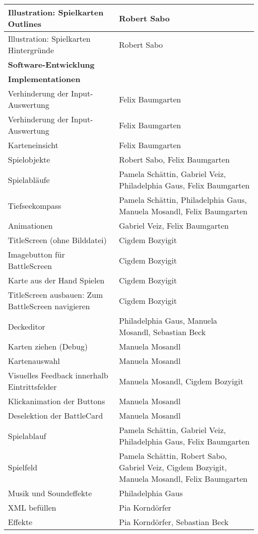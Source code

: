 \begin{longtable}{|p{8cm}|p{10cm}|}
Illustration: Spielkarten Outlines & Robert Sabo \\ \hline
Illustration: Spielkarten Hintergründe & Robert Sabo \\ \hline
\textbf{Software-Entwicklung} & \\ \hline
\textbf{Implementationen} & \\ \hline
Verhinderung der Input-Auswertung & Felix Baumgarten \\ \hline
Verhinderung der Input-Auswertung & Felix Baumgarten \\ \hline
Karteneinsicht & Felix Baumgarten \\ \hline
Spielobjekte & Robert Sabo, Felix Baumgarten \\ \hline
Spielabläufe & Pamela Schättin, Gabriel Veiz, Philadelphia Gaus, Felix Baumgarten \\ \hline
Tiefseekompass & Pamela Schättin, Philadelphia Gaus, Manuela Mosandl, Felix Baumgarten \\ \hline
Animationen & Gabriel Veiz, Felix Baumgarten \\ \hline
TitleScreen (ohne Bilddatei) & Cigdem Bozyigit \\ \hline
Imagebutton für BattleScreen & Cigdem Bozyigit \\ \hline
Karte aus der Hand Spielen & Cigdem Bozyigit \\ \hline
TitleScreen ausbauen: Zum BattleScreen navigieren & Cigdem Bozyigit \\ \hline
Deckeditor & Philadelphia Gaus, Manuela Mosandl, Sebastian Beck \\ \hline
Karten ziehen (Debug) & Manuela Mosandl \\ \hline
Kartenauswahl & Manuela Mosandl \\ \hline
Visuelles Feedback innerhalb Eintrittsfelder & Manuela Mosandl, Cigdem Bozyigit \\ \hline
Klickanimation der Buttons & Manuela Mosandl \\ \hline
Deselektion der BattleCard & Manuela Mosandl \\ \hline
Spielablauf & Pamela Schättin, Gabriel Veiz, Philadelphia Gaus, Felix Baumgarten \\ \hline
Spielfeld & Pamela Schättin, Robert Sabo, Gabriel Veiz, Cigdem Bozyigit, Manuela Mosandl, Felix Baumgarten \\ \hline
Musik und Soundeffekte & Philadelphia Gaus \\ \hline
XML befüllen & Pia Korndörfer \\ \hline
Effekte & Pia Korndörfer, Sebastian Beck \\ \hline

\end{longtable}
